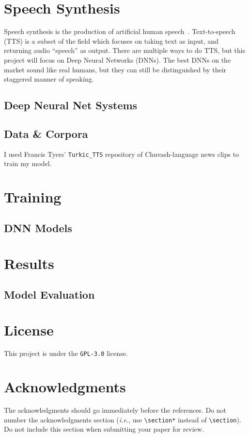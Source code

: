 \documentclass[11pt,a4paper]{article}
\begin{document}
\section{Speech Synthesis}
Speech synthesis is the production of artificial human speech~\cite{wiki-speechsynthesis}. Text-to-speech (TTS) is a subset of the field which focuses on taking text as input, and returning audio ``speech'' as output. There are multiple ways to do TTS, but this project will focus on Deep Neural Networks (DNNs). The best DNNs on the market sound like real humans, but they can still be distinguished by their staggered manner of speaking.

\subsection{Deep Neural Net Systems}
\label{ssec:dnn}

\subsection{Data \& Corpora}
\label{ssec:data}

I used Francis Tyers' \texttt{Turkic\_TTS} repository of Chuvash-language news clips to train my model.

\section{Training}


\subsection{DNN Models}
\label{ssec:models}


\section{Results}
\label{sect:results}

\subsection{Model Evaluation}
\label{ssec:evaluation}

\section*{License}
This project is under the \texttt{GPL-3.0} license.

\section*{Acknowledgments}
The acknowledgments should go immediately before the references.  Do not number the acknowledgments section ({\em i.e.}, use \verb|\section*| instead of \verb|\section|). Do not include this section when submitting your paper for review.

%
%


\end{document}
